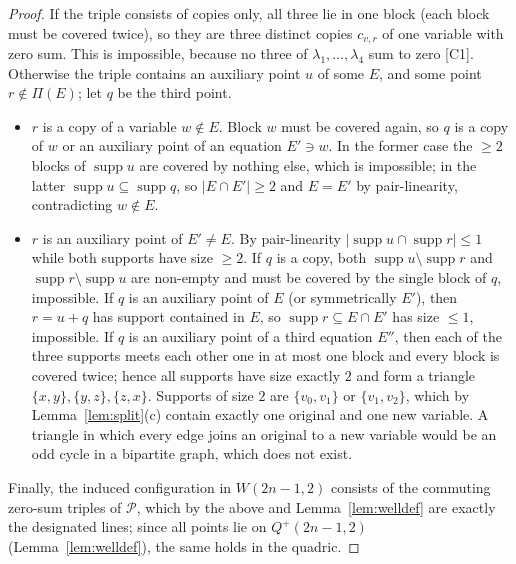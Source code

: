 \documentclass[a4paper,onecolumn,11pt,unpublished,nopdfoutputerror]{quantumarticle}
\theoremstyle{definition}
\newcommand{\cert}[1]{\textcolor{certblue}{\textsf{[#1]}}}
\newcommand{\Pts}{\mathcal{P}}
\newcommand{\W}[1]{W(#1,2)}
\newcommand{\Qp}[1]{Q^{+}(#1,2)}
\begin{document}
\begin{proof}
If the triple consists of copies only, all three lie in one block (each block must be covered twice), so they
are three distinct copies $c_{v,r}$ of one variable with zero sum. This is impossible, because no three of
$\lambda_1,\dots,\lambda_4$ sum to zero \cert{C1}. Otherwise the triple contains an auxiliary point $u$ of some $E$, and
some point $r\notin\Pi(E)$; let $q$ be the third point.
\begin{itemize}[leftmargin=*]
\item $r$ is a copy of a variable $w\notin E$. Block $w$ must be covered again, so $q$ is a copy of $w$ or an
auxiliary point of an equation $E'\ni w$. In the former case the $\ge2$ blocks of $\operatorname{supp}u$ are
covered by nothing else, which is impossible; in the latter $\operatorname{supp}u\subseteq\operatorname{supp}q$,
so $|E\cap E'|\ge2$ and $E=E'$ by pair-linearity, contradicting $w\notin E$.
\item $r$ is an auxiliary point of $E'\neq E$. By pair-linearity
$|\operatorname{supp}u\cap\operatorname{supp}r|\le1$ while both supports have size $\ge2$.
If $q$ is a copy, both $\operatorname{supp}u\setminus\operatorname{supp}r$ and
$\operatorname{supp}r\setminus\operatorname{supp}u$ are non-empty and must be covered by the single block of $q$,
impossible. If $q$ is an auxiliary point of $E$ (or symmetrically $E'$), then $r=u+q$ has support contained in
$E$, so $\operatorname{supp}r\subseteq E\cap E'$ has size $\le1$, impossible. If $q$ is an auxiliary point of a
third equation $E''$, then each of the three supports meets each other one in at most one block and every block is
covered twice; hence all supports have size exactly $2$ and form a triangle $\{x,y\},\{y,z\},\{z,x\}$. Supports of
size $2$ are $\{v_0,v_1\}$ or $\{v_1,v_2\}$, which by Lemma~\ref{lem:split}(c) contain exactly one original and
one new variable. A triangle in which every edge joins an original to a new variable would be an odd cycle in a
bipartite graph, which does not exist.
\end{itemize}
Finally, the induced configuration in $\W{2n-1}$ consists of the commuting zero-sum triples of $\Pts$, which by
the above and Lemma~\ref{lem:welldef} are exactly the designated lines; since all points lie on $\Qp{2n-1}$
(Lemma~\ref{lem:welldef}), the same holds in the quadric.
\end{proof}
\end{document}
